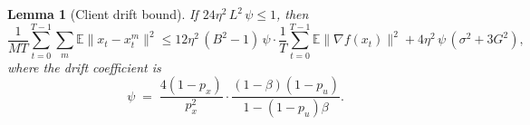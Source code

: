 \documentclass{article}
\newtheorem{lemma}[theorem]{Lemma}
\begin{document}
\begin{lemma}[Client drift bound]
\label{lem:bound}
If $24\eta^2\,L^2\,\psi \leq 1$, then
\begin{equation}
\frac{1}{MT}\sum_{t=0}^{T-1}\sum_m\mathbb{E}\|x_t - x_t^m\|^2
\leq 12\eta^2\,(B^2-1)\,\psi\cdot
\frac{1}{T}\sum_{t=0}^{T-1}\mathbb{E}\|\nabla f(x_t)\|^2
+ 4\eta^2\,\psi\,(\sigma^2 + 3G^2),
\label{eq:lem_bound_statement}
\end{equation}
where the drift coefficient is
\begin{equation}
\psi \;=\; \frac{4(1-p_x)}{p_x^2}\cdot
\frac{(1-\beta)(1-p_u)}{1-(1-p_u)\beta}.
\label{eq:psi_def_lemma}
\end{equation}
\end{lemma}
\end{document}
